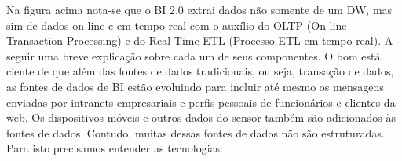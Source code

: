 Na figura acima nota-se que o BI 2.0 extrai dados n\~{a}o somente de um DW, mas sim de dados on-line e em tempo real com o aux\'{i}lio do OLTP (On-line Transaction Processing) e do Real Time ETL (Processo ETL em tempo real). A seguir uma breve explica\c{c}\~{a}o sobre cada um de seus componentes. O bom est\'{a} ciente de que al\'{e}m das fontes de dados tradicionais, ou seja, transa\c{c}\~{a}o de dados, as fontes de dados de BI est\~{a}o evoluindo para incluir at\'{e} mesmo os mensagens enviadas por intranets empresariais e perfis pessoais de funcion\'{a}rios e clientes da web. Os dispositivos m\'{o}veis e outros dados do sensor tamb\'{e}m s\~{a}o adicionados \`{a}s fontes de dados. Contudo, muitas dessas fontes de dados n\~{a}o s\~{a}o estruturadas. Para isto precisamos entender as tecnologias:

\begin{itemize}


\end{itemize}
